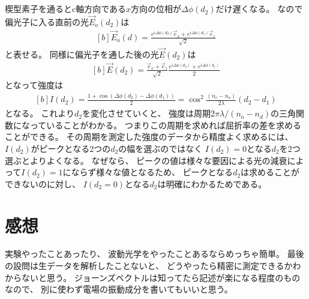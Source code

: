 \documentclass[../ap_2008.tex]{subfiles}
\begin{document}
\section{}
楔型素子を通るとc軸方向である\(x\)方向の位相が\(\Delta\phi(d_2)\)だけ遅くなる。
なので偏光子に入る直前の光\(\vec{E}_o(d_2)\)は
\begin{equation}\begin{aligned}[b]
    \vec{E}_{o}(d) = \frac{e^{i\Delta\phi(d_2)}\vec{e}_x+e^{i\Delta\phi(d_1)}\vec{e}_z}{\sqrt{2}}
\end{aligned}\end{equation}
と表せる。
同様に偏光子を通した後の光\(\vec{E}(d_2)\)は
\begin{equation}\begin{aligned}[b]
    \vec{E}(d_2) = \frac{\vec{e}_x+\vec{e}_z}{\sqrt{2}}\frac{e^{i\Delta\phi(d_2)}+e^{i\Delta\phi(d_1)}}{2}
\end{aligned}\end{equation}
となって強度は
\begin{equation}\begin{aligned}[b]
    I(d_2) = \frac{1+\cos(\Delta\phi(d_2)-\Delta\phi(d_1))}{2}
     = \cos^2 \frac{(n_e-n_o)}{2\lambda}(d_2-d_1)
\end{aligned}\end{equation}
となる。
これより\(d_2\)を変化させていくと、
強度は周期\(2\pi\lambda/(n_o-n_d)\)の三角関数になっていることがわかる。
つまりこの周期を求めれば屈折率の差を求めることができる。
その周期を測定した強度のデータから精度よく求めるには、
\(I(d_2)\)がピークとなる2つの\(d_2\)の幅を選ぶのではなく
\(I(d_2)=0\)となる\(d_2\)を2つ選ぶとよりよくなる。
なぜなら、
ピークの値は様々な要因による光の減衰によって\(I(d_2)=1\)にならず様々な値となるため、
ピークとなる\(d_2\)は求めることができないのに対し、
\(I(d_2=0)\)となる\(d_2\)は明確にわかるためである。

\section*{感想}
実験やったことあったり、
波動光学をやったことあるならめっちゃ簡単。
最後の設問は生データを解析したことないと、
どうやったら精密に測定できるかわからないと思う。
ジョーンズベクトルは知ってたら記述が楽になる程度のものなので、
別に使わず電場の振動成分を書いてもいいと思う。
\end{document}
